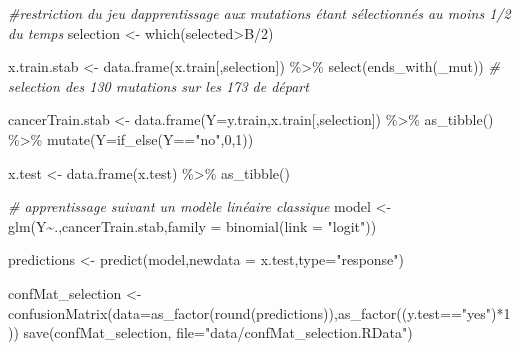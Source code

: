 \documentclass[
  12pt,
]{article}
\newenvironment{Shaded}{\begin{snugshade}}{\end{snugshade}}
\newcommand{\AttributeTok}[1]{\textcolor[rgb]{0.77,0.63,0.00}{#1}}
\newcommand{\CommentTok}[1]{\textcolor[rgb]{0.56,0.35,0.01}{\textit{#1}}}
\newcommand{\DecValTok}[1]{\textcolor[rgb]{0.00,0.00,0.81}{#1}}
\newcommand{\FunctionTok}[1]{\textcolor[rgb]{0.00,0.00,0.00}{#1}}
\newcommand{\NormalTok}[1]{#1}
\newcommand{\OtherTok}[1]{\textcolor[rgb]{0.56,0.35,0.01}{#1}}
\newcommand{\SpecialCharTok}[1]{\textcolor[rgb]{0.00,0.00,0.00}{#1}}
\newcommand{\StringTok}[1]{\textcolor[rgb]{0.31,0.60,0.02}{#1}}
\begin{document}
\begin{Shaded}
\begin{Highlighting}[]
\CommentTok{\#restriction du jeu d\textquotesingle{}apprentissage aux mutations étant sélectionnés au moins 1/2 du temps}
\NormalTok{selection }\OtherTok{\textless{}{-}} \FunctionTok{which}\NormalTok{(selected}\SpecialCharTok{\textgreater{}}\NormalTok{B}\SpecialCharTok{/}\DecValTok{2}\NormalTok{)}

\NormalTok{x.train.stab }\OtherTok{\textless{}{-}} \FunctionTok{data.frame}\NormalTok{(x.train[,selection]) }\SpecialCharTok{\%\textgreater{}\%} 
  \FunctionTok{select}\NormalTok{(}\FunctionTok{ends\_with}\NormalTok{(}\StringTok{\textquotesingle{}\_mut\textquotesingle{}}\NormalTok{)) }\CommentTok{\# selection des 130 mutations sur les 173 de départ}
  
\NormalTok{cancerTrain.stab }\OtherTok{\textless{}{-}} \FunctionTok{data.frame}\NormalTok{(}\AttributeTok{Y=}\NormalTok{y.train,x.train[,selection]) }\SpecialCharTok{\%\textgreater{}\%} 
  \FunctionTok{as\_tibble}\NormalTok{() }\SpecialCharTok{\%\textgreater{}\%} 
  \FunctionTok{mutate}\NormalTok{(}\AttributeTok{Y=}\FunctionTok{if\_else}\NormalTok{(Y}\SpecialCharTok{==}\StringTok{"no"}\NormalTok{,}\DecValTok{0}\NormalTok{,}\DecValTok{1}\NormalTok{))}

\NormalTok{x.test }\OtherTok{\textless{}{-}} \FunctionTok{data.frame}\NormalTok{(x.test) }\SpecialCharTok{\%\textgreater{}\%} 
  \FunctionTok{as\_tibble}\NormalTok{()}


\CommentTok{\# apprentissage suivant un modèle linéaire classique}
\NormalTok{model }\OtherTok{\textless{}{-}} \FunctionTok{glm}\NormalTok{(Y}\SpecialCharTok{\textasciitilde{}}\NormalTok{.,cancerTrain.stab,}\AttributeTok{family =} \FunctionTok{binomial}\NormalTok{(}\AttributeTok{link =} \StringTok{"logit"}\NormalTok{))}

\NormalTok{predictions }\OtherTok{\textless{}{-}} \FunctionTok{predict}\NormalTok{(model,}\AttributeTok{newdata =}\NormalTok{ x.test,}\AttributeTok{type=}\StringTok{"response"}\NormalTok{)}

\NormalTok{confMat\_selection }\OtherTok{\textless{}{-}} \FunctionTok{confusionMatrix}\NormalTok{(}\AttributeTok{data=}\FunctionTok{as\_factor}\NormalTok{(}\FunctionTok{round}\NormalTok{(predictions)),}\FunctionTok{as\_factor}\NormalTok{((y.test}\SpecialCharTok{==}\StringTok{"yes"}\NormalTok{)}\SpecialCharTok{*}\DecValTok{1}\NormalTok{))}
\FunctionTok{save}\NormalTok{(confMat\_selection, }\AttributeTok{file=}\StringTok{"data/confMat\_selection.RData"}\NormalTok{)}
\end{Highlighting}
\end{Shaded}
\end{document}
